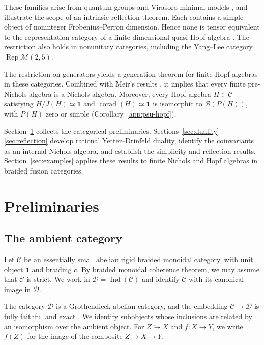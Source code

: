 \documentclass[11pt, a4paper]{article}
\numberwithin{equation}{section}
\newcommand{\C}{\mathcal C}
\newcommand{\D}{\mathcal D}
\newcommand{\B}{\mathcal B}
\newcommand{\one}{\mathbf 1}
\DeclareMathOperator{\Ind}{Ind}
\begin{document}
These families arise from quantum groups and Virasoro minimal
models \cite{RSW09,GMR24,BD12,Huang}, and illustrate the scope
of an intrinsic reflection theorem.
Each contains a simple object of noninteger Frobenius--Perron
dimension. Hence none is tensor equivalent to the representation
category of a finite-dimensional quasi-Hopf algebra
\cite[Proposition~6.1.14]{tensor}.
The restriction also holds in nonunitary categories, including
the Yang--Lee category $\operatorname{Rep}\mathcal M(2,5)$.

The restriction on generators yields a generation theorem for
finite Hopf algebras in these categories.
Combined with Meir's results
\cite[Theorems~1.4 and~1.6]{defofnichols}, it implies that every
finite pre-Nichols algebra is a Nichols algebra.
Moreover, every Hopf algebra $H\in\C$ satisfying
$H/J(H)\simeq\one$ and $\operatorname{corad}(H)\simeq\one$
is isomorphic to $\B(P(H))$, with $P(H)$ zero or simple
(Corollary~\ref{app:psu-hopf}).

{Section~\ref{sec:preliminaries} collects the categorical preliminaries.}
Sections~\ref{sec:duality}--\ref{sec:reflection} develop rational
Yetter--Drinfeld duality, identify the coinvariants as an internal
Nichols algebra, and establish the simplicity and reflection results.
Section~\ref{sec:examples} applies these results to finite Nichols
and Hopf algebras in braided fusion categories.


\section{Preliminaries}\label{sec:preliminaries}

\subsection{The ambient category}\label{pre:ambient}


Let $\C$ be an essentially small abelian {rigid braided monoidal category},
with unit object $\one$ and braiding $c$.
{By braided monoidal coherence theorem, we may  assume that
$\C$ is strict.} We work in
$\D=\Ind(\C)$ and identify $\C$ with its canonical image in $\D$.



The category $\D$ is a Grothendieck abelian category, and the embedding
$\C\longrightarrow\D$ is fully faithful and exact
\cite[Theorem~8.6.5]{KS06}.
We identify subobjects whose inclusions are related by an
isomorphism over the ambient object. For $Z\hookrightarrow X$ and
$f:X\to Y$, we write $f(Z)$ for the image of the composite
$Z\to X\to Y$. 
\end{document}

